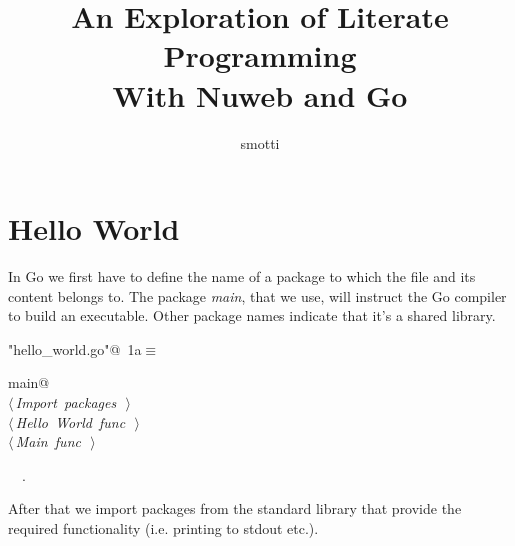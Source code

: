 \documentclass[a4paper]{report}
\title{An Exploration of Literate Programming\\ With Nuweb and Go}
\date{}
\author{smotti}
\begin{document}
\begin{titlepage}
\maketitle
\end{titlepage}

\tableofcontents

\chapter{Hello World}

In Go we first have to define the name of a package to which the file and its
content belongs to. The package \textit{main}, that we use, will instruct the
Go compiler to build an executable. Other package names indicate that it's a
shared library.
\begin{flushleft} \small
\begin{minipage}{\linewidth}\label{scrap1}\raggedright\small
{} \verb@"hello_world.go"@\nobreak\ {\footnotesize {1a}}$\equiv$
\vspace{-1ex}
\begin{list}{}{} \item
\mbox{}\verb@package main@\\
\mbox{}\verb@@\hbox{$\langle\,${\itshape Import packages}\nobreak\ {\footnotesize {}}$\,\rangle$}\verb@@\\
\mbox{}\verb@@\hbox{$\langle\,${\itshape Hello World func}\nobreak\ {\footnotesize {}}$\,\rangle$}\verb@@\\
\mbox{}\verb@@\hbox{$\langle\,${\itshape Main func}\nobreak\ {\footnotesize {}}$\,\rangle$}\verb@@\\
\mbox{}\verb@@{\NWsep}
\end{list}
\vspace{-1.5ex}
\footnotesize
\begin{list}{}{\setlength{\itemsep}{-\parsep}\setlength{\itemindent}{-\leftmargin}}
\item \NWtxtIdentsUsed\nobreak\  \verb@main@\nobreak\ .
\item{}
\end{list}
\end{minipage}\vspace{4ex}
\end{flushleft}
After that we import packages from the standard library that provide the
required functionality (i.e. printing to stdout etc.).
\end{document}
